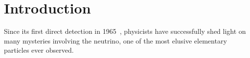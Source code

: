 
\chapter{Introduction}%
\label{chap:introduction}

Since its first direct detection in 1965~\cite{Cowan1956}, physicists
have successfully shed light on many mysteries involving the neutrino, one
of the most elusive elementary particles ever observed. 
